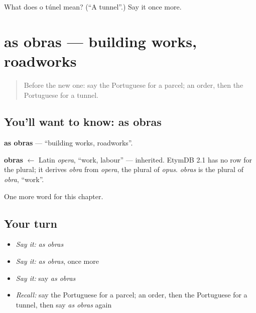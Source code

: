 \begin{tcolorbox}[breakable,colback=teal!4,colframe=teal!35!black,title={Before you move on}]
What does o túnel mean? (\textquotedblleft{}A tunnel\textquotedblright{}.) Say it once more.
\end{tcolorbox}
\section[as obras]{as obras — building works, roadworks}

\label{lesson:PT-C163-obras}



\begin{quote}
Before the new one: say the Portuguese for a parcel; an order, then the Portuguese for a tunnel.
\end{quote}

\subsection*{You'll want to know: as obras}
\textbf{as obras} — \textquotedblleft{}building works, roadworks\textquotedblright{}.

\begin{cousinweb}
\textbf{obras} $\leftarrow$ Latin \emph{opera}, \textquotedblleft{}work, labour\textquotedblright{} — inherited. EtymDB 2.1 has no row for the plural; it derives \emph{obra} from \emph{opera}, the plural of \emph{opus}. \emph{obras} is the plural of \emph{obra}, \textquotedblleft{}work\textquotedblright{}.
\end{cousinweb}

\begin{grammarlens}[title={What you've built}]
One more word for this chapter.
\end{grammarlens}

\subsection*{Your turn}
\begin{itemize}
\raggedright
  \item \emph{Say it:} \emph{as obras}
  \item \emph{Say it:} \emph{as obras}, once more
  \item \emph{Say it:} say \emph{as obras}
  \item \emph{Recall:} say the Portuguese for a parcel; an order, then the Portuguese for a tunnel, then say \emph{as obras} again
\end{itemize}


